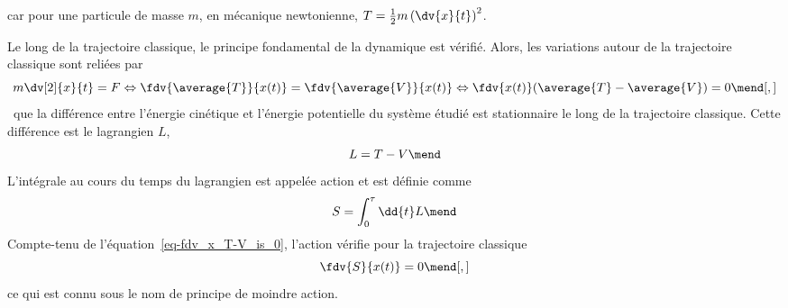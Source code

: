 car pour une particule de masse $m$, en mécanique newtonienne, $T = \frac{1}{2}m\left(\dv{x}{t}\right)^2$.
\par
Le long de la trajectoire classique, le principe fondamental de la dynamique est vérifié. Alors, les variations autour de la trajectoire classique sont reliées par
\begin{equation}
m\dv[2]{x}{t} = F
\Leftrightarrow
\fdv{\average{T}}{x(t)} = \fdv{\average{V}}{x(t)}
\Leftrightarrow
\fdv{x(t)}(\average{T}-\average{V}) = 0 \label{eq-fdv_x_T-V_is_0}
\mend[,]
\end{equation}
\ie\ que
la différence entre l'énergie cinétique et l'énergie potentielle du système étudié
est stationnaire le long de la trajectoire classique.
Cette différence est
le lagrangien $L$,
\begin{equation}
L = T-V
\mend
\end{equation}
L'intégrale au cours du temps du lagrangien est appelée action et est définie comme
\begin{equation}
S = \int_0^\tau\dd{t}L
\mend
\end{equation}
Compte-tenu de l'équation~\eqref{eq-fdv_x_T-V_is_0}, l'action vérifie pour la trajectoire classique
\begin{equation}
\fdv{S}{x(t)}=0
\mend[,]
\label{eq-pp_moindre_action}
\end{equation}
ce qui est connu sous le nom de principe de moindre action.
